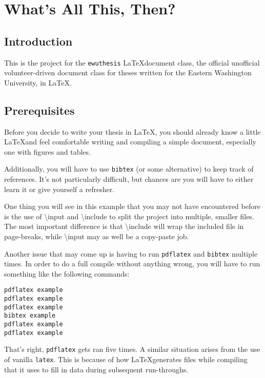 \chapter{What's All This, Then?}

\section{Introduction}

This is the project for the \texttt{ewuthesis} \LaTeX document class, the
official unofficial volunteer-driven document class for theses written for the
Eastern Washington University, in \LaTeX.

\section{Prerequisites}

Before you decide to write your thesis in \LaTeX, you should already know a
little \LaTeX and feel comfortable writing and compiling a simple document,
especially one with figures and tables.

Additionally, you will have to use \texttt{bibtex} (or some alternative) to keep
track of references. It's not particularly difficult, but chances are you will
have to either learn it or give yourself a refresher.

One thing you will see in this example that you may not have encountered before
is the use of \textbackslash input and \textbackslash include to split the project into multiple, smaller
files. The most important difference is that \textbackslash include will wrap the included
file in page-breaks, while \textbackslash input may as well be a copy-paste job.

Another issue that may come up is having to run \texttt{pdflatex} and
\texttt{bibtex} multiple times. In order to do a full compile without anything
wrong, you will have to run something like the following commands:

\begin{verbatim}
pdflatex example
pdflatex example
pdflatex example
bibtex example
pdflatex example
pdflatex example
\end{verbatim}

That's right, \texttt{pdflatex} gets ran five times. A similar situation arises
from the use of vanilla \texttt{latex}. This is because of how \LaTeX generates
files while compiling that it uses to fill in data during subsequent 
run-throughs.

